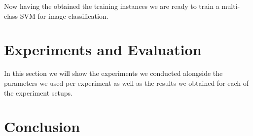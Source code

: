 \documentclass[11pt]{article}
\begin{document}
Now having the obtained the training instances we are ready to train a multi-class SVM for image classification.

\section{Experiments and Evaluation}
In this section we will show the experiments we conducted alongside the parameters we used per experiment as well as the results we obtained for each of the experiment setups.

\section{Conclusion}

{}

\end{document}
